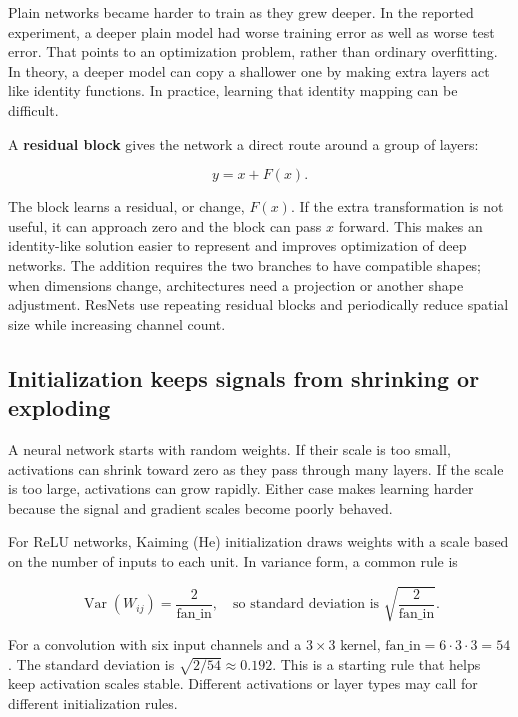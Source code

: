 Plain networks became harder to train as they grew deeper. In the reported experiment, a deeper plain model had worse training error as well as worse test error. That points to an optimization problem, rather than ordinary overfitting. In theory, a deeper model can copy a shallower one by making extra layers act like identity functions. In practice, learning that identity mapping can be difficult.

A \textbf{residual block} gives the network a direct route around a group of layers:

\[y=x+F(x).\]

The block learns a residual, or change, \(F(x)\). If the extra transformation is not useful, it can approach zero and the block can pass \(x\) forward. This makes an identity-like solution easier to represent and improves optimization of deep networks. The addition requires the two branches to have compatible shapes; when dimensions change, architectures need a projection or another shape adjustment. ResNets use repeating residual blocks and periodically reduce spatial size while increasing channel count.

\subsection{Initialization keeps signals from shrinking or exploding}\label{04-visual-computing-ii-ch031-initialization-keeps-signals-from-shrinking-or-exploding}

\hypertarget{04-visual-computing-ii-ch031-initialization-keeps-signals-from-shrinking-or-exploding}{}

A neural network starts with random weights. If their scale is too small, activations can shrink toward zero as they pass through many layers. If the scale is too large, activations can grow rapidly. Either case makes learning harder because the signal and gradient scales become poorly behaved.

For ReLU networks, Kaiming (He) initialization draws weights with a scale based on the number of inputs to each unit. In variance form, a common rule is

\[\operatorname{Var}(W_{ij})=\frac{2}{\text{fan\_in}}, \quad\text{so standard deviation is }\sqrt{\frac{2}{\text{fan\_in}}}.\]

For a convolution with six input channels and a \(3\times3\) kernel, \(\text{fan\_in}=6\cdot3\cdot3=54\). The standard deviation is \(\sqrt{2/54}\approx0.192\). This is a starting rule that helps keep activation scales stable. Different activations or layer types may call for different initialization rules.


